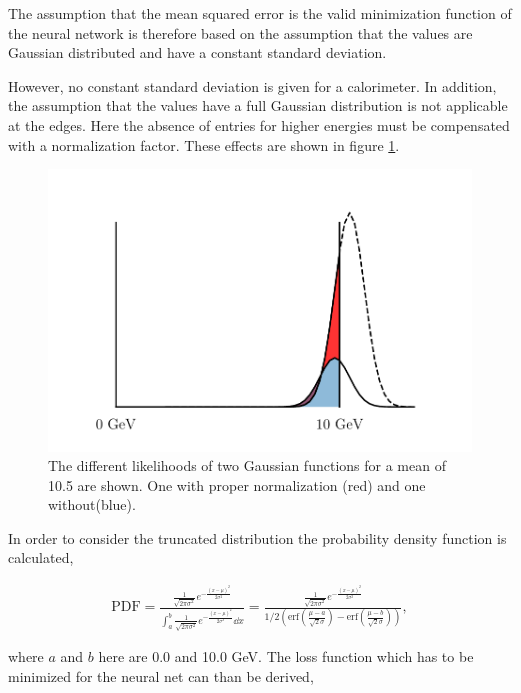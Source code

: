 \documentclass[12pt, a4paper]{thesis}
\begin{document}
The assumption that the mean squared error is the valid minimization
function of the neural network is therefore based on the assumption
that the values are Gaussian distributed and have a constant standard
deviation.

However, no constant standard deviation is given for a calorimeter. In
addition, the assumption that the values have a full Gaussian
distribution is not applicable at the edges. Here the absence of
entries for higher energies must be compensated with a normalization
factor. These effects are shown in figure \ref{gaussian-shift}.


\begin{figure}[H]
  \centering
  \includegraphics[width=.9\linewidth]{../images/gaussian_shift.png}
  \caption{The different likelihoods of two Gaussian functions for a
    mean of 10.5 are shown. One with proper normalization (red) and
    one without(blue).}
  \label{gaussian-shift}
\end{figure}

In order to consider the truncated distribution the probability
density function is calculated,

\begin{align}
\text{PDF} = \frac{\frac{1}{\sqrt{2\pi \sigma^2}}
  e^{-\frac{(x-\mu)^2}{2 \sigma^2}}}{\int^b_a \frac{1}{\sqrt{2\pi
      \sigma^2}} e^{-\frac{(x-\mu)^2}{2 \sigma^2}} \dd x} =
\frac{\frac{1}{\sqrt{2\pi \sigma^2}} e^{-\frac{(x-\mu)^2}{2
      \sigma^2}}}{1/2\left(\text{erf}\left(\frac{\mu-a}{\sqrt{2}\sigma}\right)
  - \text{erf}\left(\frac{\mu-b}{\sqrt{2}\sigma}\right)\right)},
\end{align}

where \(a\) and \(b\) here are 0.0 and 10.0 GeV. The loss function
which has to be minimized for the neural net can than be derived,
\end{document}
